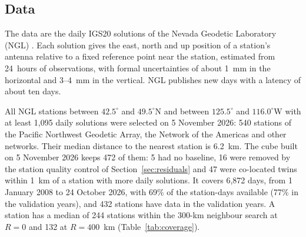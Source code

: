 \documentclass[preprint,12pt,authoryear]{elsarticle}
\begin{document}
\subsection{Data}
\label{sec:stations}

The data are the daily IGS20 solutions of the Nevada Geodetic Laboratory (NGL) \citep{blewitt2018, ngl2026}. Each solution gives the east, north and up position of a station's antenna relative to a fixed reference point near the station, estimated from 24~hours of observations, with formal uncertainties of about 1~mm in the horizontal and 3--4~mm in the vertical. NGL publishes new days with a latency of about ten days.

All NGL stations between $42.5^\circ$ and $49.5^\circ$N and between $125.5^\circ$ and $116.0^\circ$W with at least 1,095 daily solutions were selected on 5 November 2026: 540 stations of the Pacific Northwest Geodetic Array, the Network of the Americas and other networks. Their median distance to the nearest station is 6.2~km. The cube built on 5 November 2026 keeps 472 of them: 5 had no baseline, 16 were removed by the station quality control of Section~\ref{sec:residuals} and 47 were co-located twins within 1~km of a station with more daily solutions. It covers 6,872 days, from 1 January 2008 to 24 October 2026, with 69\% of the station-days available (77\% in the validation years), and 432 stations have data in the validation years. A station has a median of 244 stations within the 300-km neighbour search at $R = 0$ and 132 at $R = 400$~km (Table~\ref{tab:coverage}).
\end{document}
